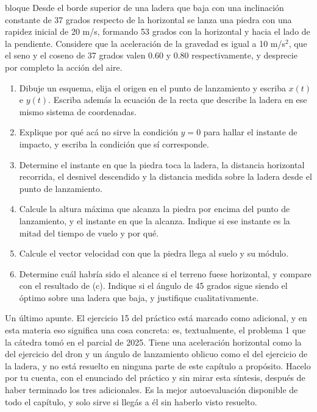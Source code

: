 \documentclass[11pt,openany]{book}
\begin{document}
\begin{ejercicio}{bloque}
Desde el borde superior de una ladera que baja con una inclinación constante de 37 grados respecto de la horizontal se lanza una piedra con una rapidez inicial de 20 m/s, formando 53 grados con la horizontal y hacia el lado de la pendiente. Considere que la aceleración de la gravedad es igual a 10 m/s$^2$, que el seno y el coseno de 37 grados valen 0.60 y 0.80 respectivamente, y desprecie por completo la acción del aire.
\begin{enumerate}[label=(\alph*), leftmargin=1.7em, itemsep=1pt, topsep=3pt]
  \item Dibuje un esquema, elija el origen en el punto de lanzamiento y escriba $x(t)$ e $y(t)$. Escriba además la ecuación de la recta que describe la ladera en ese mismo sistema de coordenadas.
  \item Explique por qué acá no sirve la condición $y = 0$ para hallar el instante de impacto, y escriba la condición que sí corresponde.
  \item Determine el instante en que la piedra toca la ladera, la distancia horizontal recorrida, el desnivel descendido y la distancia medida sobre la ladera desde el punto de lanzamiento.
  \item Calcule la altura máxima que alcanza la piedra por encima del punto de lanzamiento, y el instante en que la alcanza. Indique si ese instante es la mitad del tiempo de vuelo y por qué.
  \item Calcule el vector velocidad con que la piedra llega al suelo y su módulo.
  \item Determine cuál habría sido el alcance si el terreno fuese horizontal, y compare con el resultado de (c). Indique si el ángulo de 45 grados sigue siendo el óptimo sobre una ladera que baja, y justifique cualitativamente.
\end{enumerate}
\end{ejercicio}

Un último apunte. El ejercicio 15 del práctico está marcado como adicional, y en esta materia eso significa una cosa concreta: es, textualmente, el problema 1 que la cátedra tomó en el parcial de 2025. Tiene una aceleración horizontal como la del ejercicio del dron y un ángulo de lanzamiento oblicuo como el del ejercicio de la ladera, y no está resuelto en ninguna parte de este capítulo a propósito. Hacelo por tu cuenta, con el enunciado del práctico y sin mirar esta síntesis, después de haber terminado los tres adicionales. Es la mejor autoevaluación disponible de todo el capítulo, y solo sirve si llegás a él sin haberlo visto resuelto.
\end{document}
